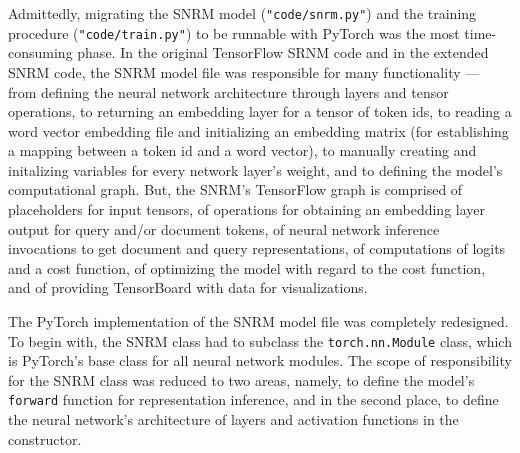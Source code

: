 Admittedly, migrating the SNRM model (\texttt{"code/snrm.py"}) and the training procedure 
    (\texttt{"code/train.py"}) to be runnable with PyTorch was the most time-consuming phase.
In the original TensorFlow SRNM code and in the extended SNRM code, the SNRM model file
    was responsible for many functionality --- from defining the neural network architecture
    through layers and tensor operations, to returning an embedding layer for a tensor of token ids,
    to reading a word vector embedding file and initializing an embedding matrix 
    (for establishing a mapping between a token id and a word vector),
    to manually creating and initalizing variables for every network layer's weight,
    and to defining the model's computational graph.
But, the SNRM's TensorFlow graph is comprised of placeholders for input tensors,
    of operations for obtaining an embedding layer output for query and/or document tokens,
    of neural network inference invocations to get document and query representations,
    of computations of logits and a cost function, 
    of optimizing the model with regard to the cost function,
    and of providing TensorBoard with data for visualizations.

The PyTorch implementation of the SNRM model file was completely redesigned.
To begin with, the SNRM class had to subclass the \texttt{torch.nn.Module} class, which is PyTorch's
    base class for all neural network modules.
The scope of responsibility for the SNRM class was reduced to two areas,
    namely, to define the model's \texttt{forward} function for representation inference, 
    and in the second place, to define the neural network's architecture of layers and activation functions
    in the constructor.

